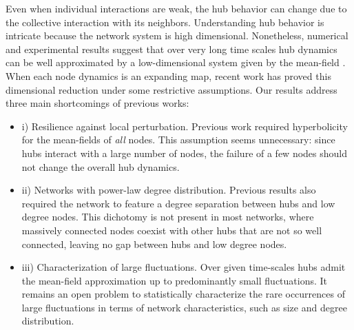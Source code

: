 \documentclass[a4paper]{article}
\theoremstyle{plain}
\theoremstyle{definition}
\begin{document}
Even when individual interactions are weak, the hub behavior can change due to the collective interaction with its neighbors. Understanding hub behavior is intricate because the network system is high dimensional. Nonetheless, numerical and experimental results suggest that over very long time scales hub dynamics can be well approximated by a low-dimensional system given by the mean-field \cite{pereira2010hub,baptista2012collective,Ric16}. 
When each node dynamics is an expanding map, recent work \cite{PvST20} has proved this dimensional reduction under some restrictive assumptions.
Our results address three main shortcomings of previous works:
\begin{itemize}
\item[] i) Resilience against local perturbation. Previous work required 
hyperbolicity for the mean-fields of \textit{all} nodes. This assumption seems unnecessary: since hubs interact with a large number of nodes, the failure of a few nodes should not change the overall hub dynamics. 

\item[] ii) Networks with power-law degree distribution. Previous results also required the network to feature a degree separation between hubs and low degree nodes. This dichotomy is not present in most networks, where massively connected nodes coexist with other hubs that are not so well connected, leaving no gap between hubs and low degree nodes. %

\item[] iii) Characterization of large fluctuations. Over given time-scales hubs admit the mean-field approximation up to predominantly small fluctuations. It remains an open problem to statistically characterize the rare occurrences of large fluctuations in terms of network characteristics, such as size and degree distribution. %
\end{itemize}
\end{document}
